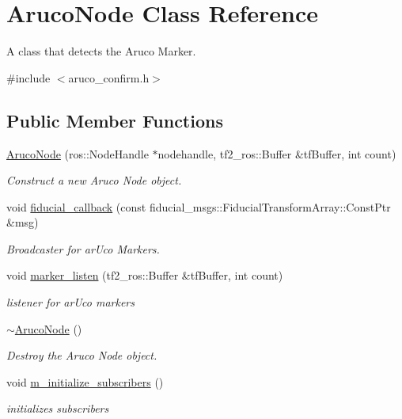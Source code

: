 \hypertarget{class_aruco_node}{}\section{Aruco\+Node Class Reference}
\label{class_aruco_node}


A class that detects the Aruco Marker.  




{\ttfamily \#include $<$aruco\+\_\+confirm.\+h$>$}

\subsection*{Public Member Functions}
\begin{DoxyCompactItemize}
\item 
\hyperlink{class_aruco_node_af8a93117bb0cf5f43bc10d3f0c2e9777}{Aruco\+Node} (ros\+::\+Node\+Handle $\ast$nodehandle, tf2\+\_\+ros\+::\+Buffer \&tf\+Buffer, int count)
\begin{DoxyCompactList}\small\item\em Construct a new Aruco Node object. \end{DoxyCompactList}\item 
void \hyperlink{class_aruco_node_af68c583d73a36c483d28b96a6fd22713}{fiducial\+\_\+callback} (const fiducial\+\_\+msgs\+::\+Fiducial\+Transform\+Array\+::\+Const\+Ptr \&msg)
\begin{DoxyCompactList}\small\item\em Broadcaster for ar\+Uco Markers. \end{DoxyCompactList}\item 
void \hyperlink{class_aruco_node_ad79fd951057c9a40f34fc159363fbd94}{marker\+\_\+listen} (tf2\+\_\+ros\+::\+Buffer \&tf\+Buffer, int count)
\begin{DoxyCompactList}\small\item\em listener for ar\+Uco markers \end{DoxyCompactList}\item 
\hyperlink{class_aruco_node_a134694163a28530a800198e2c039eb25}{$\sim$\+Aruco\+Node} ()
\begin{DoxyCompactList}\small\item\em Destroy the Aruco Node object. \end{DoxyCompactList}\item 
void \hyperlink{class_aruco_node_a3aa9013d9f53f08c7de83be3359f7503}{m\+\_\+initialize\+\_\+subscribers} ()
\begin{DoxyCompactList}\small\item\em initializes subscribers \end{DoxyCompactList}\end{DoxyCompactItemize}
